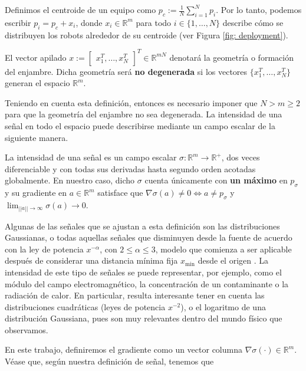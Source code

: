 Definimos el centroide de un equipo como $p_c := \frac{1}{N}\sum_{i=1}^{N}p_i$. Por lo tanto, podemos escribir $p_i = p_c + x_i$, donde $x_i\in\mathds{R}^m$ para todo $i\in\{1,\dots,N\}$ describe cómo se distribuyen los robots alrededor de su centroide (ver Figura \ref{fig: deployment}).

\begin{definition} 
El vector apilado $x := \begin{bmatrix}x_1^T, \dots, x_N^T\end{bmatrix}^T \in \mathds{R}^{mN}$ denotará la geometría o formación del enjambre. Dicha geometría será \textbf{no degenerada} si los vectores $\{x_1^T, \dots, x_N^T\}$ generan el espacio $\mathds{R}^m$.
\end{definition}

Teniendo en cuenta esta definición, entonces es necesario imponer que $N > m \geq 2$ para que la geometría del enjambre no sea degenerada. La intensidad de una señal en todo el espacio puede describirse mediante un campo escalar de la siguiente manera.

\begin{definition} 
La intensidad de una señal es un campo escalar $\sigma: \mathbb{R}^m \to \mathbb{R}^+$, dos veces diferenciable y con todas sus derivadas hasta segundo orden acotadas globalmente. En nuestro caso, dicho $\sigma$ cuenta únicamente con \textbf{un máximo} en $p_\sigma$ y su gradiente en $a\in\mathbb{R}^m$ satisface que $\nabla\sigma(a) \neq 0 \iff a \neq p_\sigma$ y $\lim_{||a||\to\infty}\sigma(a) \to 0$.
\end{definition}

Algunas de las señales que se ajustan a esta definición son las distribuciones Gaussianas, o todas aquellas señales que disminuyen desde la fuente de acuerdo con la ley de potencia $x^{-\alpha}$, con $2 \leq \alpha \leq 3$, modelo que comienza a ser aplicable después de considerar una distancia mínima fija $x_{\text{min}}$ desde el origen \cite{clauset2009power}. La intensidad de este tipo de señales se puede representar, por ejemplo, como el módulo del campo electromagnético, la concentración de un contaminante o la radiación de calor. En particular, resulta interesante tener en cuenta las distribuciones cuadráticas (leyes de potencia $x^{-2}$), o el logaritmo de una distribución Gaussiana, pues son muy relevantes dentro del mundo físico que observamos.

En este trabajo, definiremos el gradiente como un vector columna $\nabla\sigma(\cdot) \in \mathds{R}^m$. Véase que, según nuestra definición de señal, tenemos que


